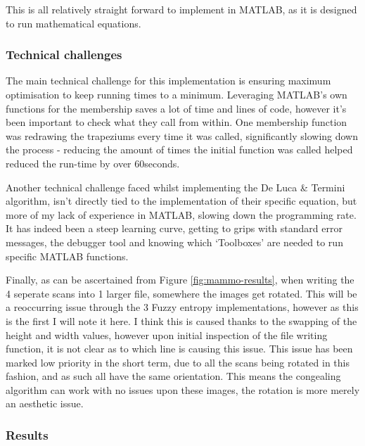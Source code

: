 This is all relatively straight forward to implement in MATLAB, as it is designed to run mathematical equations.


\subsubsection{Technical challenges}

The main technical challenge for this implementation is ensuring maximum optimisation to keep running times to a minimum. Leveraging MATLAB's own functions for the membership saves a lot of time and lines of code, however it's been important to check what they call from within. One membership function was redrawing the trapeziums every time it was called, significantly slowing down the process - reducing the amount of times the initial function was called helped reduced the run-time by over 60seconds.

Another technical challenge faced whilst implementing the De Luca \& Termini algorithm, isn't directly tied to the implementation of their specific equation, but more of my lack of experience in MATLAB, slowing down the programming rate. It has indeed been a steep learning curve, getting to grips with standard error messages, the debugger tool and knowing which `Toolboxes' are needed to run specific MATLAB functions.

Finally, as can be ascertained from Figure \ref{fig:mammo-results}, when writing the 4 seperate scans into 1 larger file, somewhere the images get rotated. This will be a reoccurring issue through the 3 Fuzzy entropy implementations, however as this is the first I will note it here. I think this is caused thanks to the swapping of the height and width values, however upon initial inspection of the file writing function, it is not clear as to which line is causing this issue. This issue has been marked low priority in the short term, due to all the scans being rotated in this fashion, and as such all have the same orientation. This means the congealing algorithm can work with no issues upon these images, the rotation is more merely an aesthetic issue.

\subsubsection{Results}

